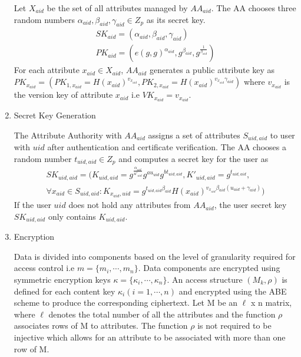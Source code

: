 \begin{enumerate}
	Let $ X_{aid} $ be the set of all attributes managed by $ AA_{aid} $. The AA chooses three random numbers $ \alpha_{aid}, \beta_{aid}, \gamma_{aid} \in Z_{p} $ as its secret key.
	\begin{align*}
		SK_{aid} = (\alpha_{aid}, \beta_{aid}, \gamma_{aid}) \\
		PK_{aid} = (e(g, g)^{\alpha_{aid}}, g^{\beta_{aid}}, g^{\frac{1}{\beta_{aid}}})
	\end{align*}
	For each attribute $ x_{aid} \in X_{aid} $, $ AA_{aid} $ generates a public attribute key as $ PK_{x_{aid}} = (PK_{1, x_{aid}} = H(x_{aid})^{v_{x_{aid}}}, PK_{2, x_{aid}} = H(x_{aid})^{v_{x_{aid}}\gamma_{aid}}) $ where $ v_{x_{aid}} $ is the version key of attribute $ x_{aid} $ i.e $ VK_{x_{aid}} = v_{x_{aid}} $.
	
	\item Secret Key Generation
	
	The Attribute Authority with $ AA_{aid} $ assigns a set of attributes $ S_{uid,aid} $ to user with $ uid $ after authentication and certificate verification. The AA chooses a random number $ t_{uid,aid} \in Z_{p} $ and computes a secret key for the user as
	\begin{align*}
		SK_{uid,aid} = (K_{uid,aid} = g^{\frac{\alpha_{aid}}{u'_{uid}}}g^{au_{uid}}g^{bt_{uid,aid}}, K'_{uid,aid} = g^{t_{uid,aid}}, \\
		\forall x_{aid} \in S_{uid,aid} \colon K_{x_{aid},uid} = g^{t_{uid,aid}\beta_{aid}}H(x_{aid})^{v_{x_{aid}}\beta_{aid}(u_{uid} + \gamma_{aid})})
	\end{align*}
	If the user $ uid $ does not hold any attributes from $ AA_{aid} $, the user secret key $ SK_{uid,aid} $ only contains $ K_{uid,aid} $.
	
	\item Encryption
	
	Data is divided into components based on the level of granularity required for access control i.e $ m = \{m_{i}, \cdots, m_{n}\} $. Data components are encrypted using symmetric encryption keys $ \kappa = \{\kappa_{i}, \cdots, \kappa_{n}\} $. An access structure $ (M_{k}, \rho) $ is defined for each content key $ \kappa_{i} (i = 1, \cdots, n) $ and encrypted using the ABE scheme to produce the corresponding ciphertext. Let M be an $\ell$ x n matrix, where $\ell$ denotes the total number of all the attributes and the function $ \rho $ associates rows of M to attributes. The function $\rho$ is not required to be injective which allows for an attribute to be associated with more than one row of M.
	

\end{enumerate}
